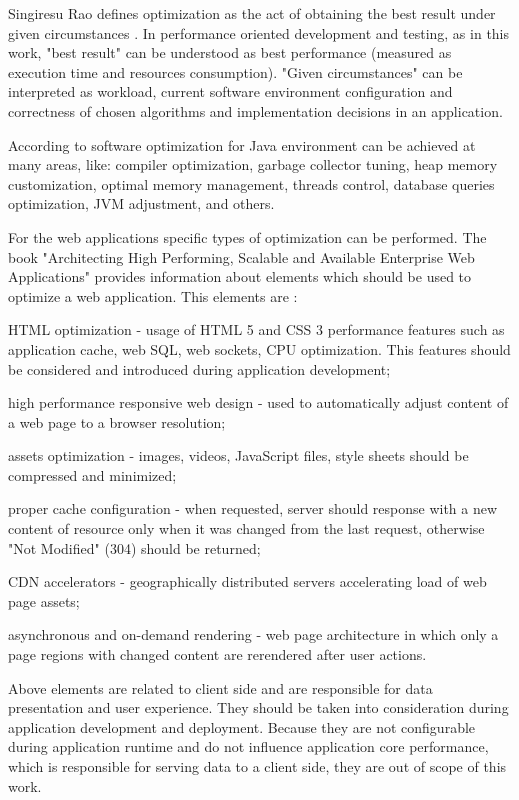 \documentclass[12pt,a4paper]{article}
\let\tempone\itemize
\let\temptwo\enditemize
\renewenvironment{itemize}{\tempone\addtolength{\itemsep}{-0.4\baselineskip}}{\temptwo}
\begin{document}
Singiresu Rao defines optimization as the act of obtaining the best result under given circumstances \cite{optimizationtheory}. In performance oriented development and testing, as in this work, "best result" can be understood as best performance (measured as execution time and resources consumption). "Given circumstances" can be interpreted as workload, current software environment configuration and correctness of chosen algorithms and implementation decisions in an application. 

According to  \cite{javaperformance} software optimization for Java environment can be achieved at many areas, like: compiler optimization, garbage collector tuning, heap memory customization, optimal memory management, threads control, database queries optimization, JVM adjustment, and others.

For the web applications specific types of optimization can be performed.  
The book "Architecting High Performing, Scalable and Available Enterprise Web Applications"  provides information about elements which should be used to optimize a web application. This elements are \cite{architectingperformance}:
\begin{itemize}
 \item HTML optimization - usage of HTML 5 and CSS 3 performance features such as application cache, web SQL, web sockets, CPU optimization. This features should be considered and introduced during application development; 
 \item high performance responsive web design - used to automatically adjust content of a web page to a browser resolution; 
 \item assets optimization - images, videos, JavaScript files, style sheets should be compressed and minimized; 
 \item proper cache configuration - when requested, server should response with a new content of resource only when it was changed from the last request, otherwise "Not Modified" (304) should be returned;
 \item CDN accelerators - geographically distributed servers accelerating  load of web page assets; 
 \item asynchronous and on-demand rendering - web page architecture in which only a page regions with changed content are rerendered after user actions.  
\end{itemize}

Above elements are related to client side and are responsible for data presentation and user experience. They should be taken into consideration during application development and deployment. Because they are not configurable during application runtime and do not influence application core performance, which is responsible for serving data to a client side, they are out of scope of this work. 
\end{document}
